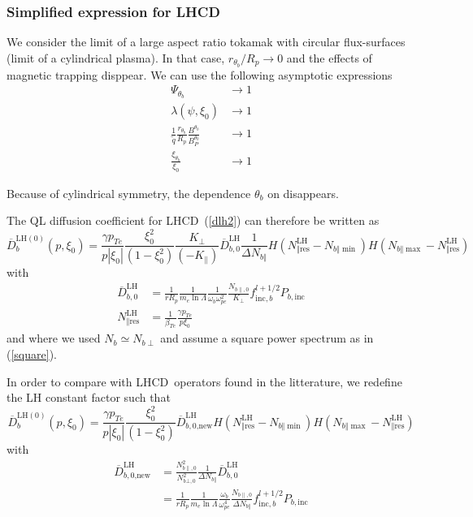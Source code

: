 \subsubsection{Simplified expression for LHCD}\label{simplifiedlhcd}

We consider the limit of a large aspect ratio tokamak with circular
flux-surfaces (limit of a cylindrical plasma). In that case, $r_{\theta_{b}%
}/R_{p}\rightarrow0$ and the effects of magnetic trapping disppear. We can use
the following asymptotic expressions
\begin{align}
\Psi_{\theta_{b}}  &  \rightarrow1\\
\lambda\left(  \psi,\xi_{0}\right)   &  \rightarrow1\\
\frac{1}{\widetilde{q}}\frac{r_{\theta_{b}}}{R_{p}}\frac{B^{\theta_{b}}}%
{B_{P}^{\theta_{b}}}  &  \rightarrow1\\
\frac{\xi_{\theta_{b}}}{\xi_{0}}  &  \rightarrow1
\end{align}

Because of cylindrical symmetry, the dependence $\theta_{b}$ on disappears.

The QL diffusion coefficient for LHCD\ (\ref{dlh2}) can therefore be written
as%
\begin{equation}
\overline{D}_{b}^{\text{LH}(0)}(p,\xi_{0})=\frac{\gamma p_{Te}}{p\left|
\xi_{0}\right|  }\frac{\xi_{0}^{2}}{\left(  1-\xi_{0}^{2}\right)  }%
\frac{K_{\perp}}{\left(  -K_{\parallel}\right)  }\overline{D}_{b,0}%
^{\text{LH}}\frac{1}{\Delta N_{b\Vert}}H\left(  N_{\Vert\text{res}}%
^{\text{LH}}-N_{b\Vert\min}\right)  H\left(  N_{b\Vert\max}-N_{\Vert
\text{res}}^{\text{LH}}\right)
\end{equation}
with
\begin{align}
\overline{D}_{b,0}^{\text{LH}}  &  =\frac{1}{rR_{p}}\frac{1}{m_{e}\ln\Lambda
}\frac{1}{\omega_{b}\omega_{pe}^{2}}\frac{N_{b\parallel,0}}{K_{\perp}%
}f_{\text{inc},b}^{l+1/2}P_{b,\text{inc}}\\
N_{\Vert\text{res}}^{\text{LH}}  &  =\frac{1}{\beta_{Te}}\frac{\gamma p_{Te}%
}{p\xi_{0}}%
\end{align}
and where we used $N_{b}\simeq N_{b\perp}$ and assume a square power spectrum
as in (\ref{square}).

In order to compare with LHCD\ operators found in the litterature, we redefine
the LH constant factor such that%
\begin{equation}
\overline{D}_{b}^{\text{LH}(0)}(p,\xi_{0})=\frac{\gamma p_{Te}}{p\left|
\xi_{0}\right|  }\frac{\xi_{0}^{2}}{\left(  1-\xi_{0}^{2}\right)  }%
\overline{D}_{b,0\text{,new}}^{\text{LH}}H\left(  N_{\Vert\text{res}%
}^{\text{LH}}-N_{b\Vert\min}\right)  H\left(  N_{b\Vert\max}-N_{\Vert
\text{res}}^{\text{LH}}\right)
\end{equation}
with
\begin{align}
\overline{D}_{b,0\text{,new}}^{\text{LH}}  &  =\frac{N_{b\parallel,0}^{2}%
}{N_{b\bot,0}^{2}}\frac{1}{\Delta N_{b\Vert}}\overline{D}_{b,0}^{\text{LH}}\\
&  =\frac{1}{rR_{p}}\frac{1}{m_{e}\ln\Lambda}\frac{\omega_{b}}{\omega_{pe}%
^{4}}\frac{N_{b\parallel,0}}{\Delta N_{b\Vert}}f_{\text{inc},b}^{l+1/2}%
P_{b,\text{inc}} \label{dlh1}%
\end{align}

